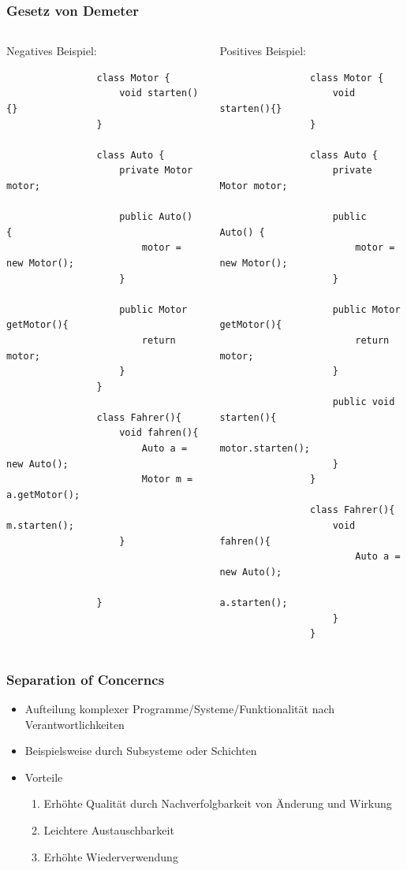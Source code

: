 \begin{frame}[fragile]
	\frametitle{Gesetz von Demeter}
	\begin{columns}
		\begin{column}{0.5\textwidth}
			Negatives Beispiel:
			\begin{lstlisting}
				class Motor {
					void starten(){}
				}
				
				class Auto {
					private Motor motor;
					
					public Auto() {
						motor = new Motor();
					}
					
					public Motor getMotor(){
						return motor;
					}
				}
				
				class Fahrer(){
					void fahren(){
						Auto a = new Auto();
						Motor m = a.getMotor();
						m.starten();
					}
						
						
					
				}
			\end{lstlisting}
		\end{column}
		\begin{column}{0.5\textwidth}
			Positives Beispiel:
			\begin{lstlisting}
				class Motor {
					void starten(){}
				}
				
				class Auto {
					private Motor motor;
					
					public Auto() {
						motor = new Motor();
					}
					
					public Motor getMotor(){
						return motor;
					}
					
					public void starten(){
						motor.starten();
					}
				}
				
				class Fahrer(){
					void fahren(){
						Auto a = new Auto();
						a.starten();
					}
				}
			\end{lstlisting}
		\end{column}
	\end{columns}
\end{frame}

\begin{frame}[fragile]
	\frametitle{Separation of Concerncs}
	\begin{itemize}
	  \item Aufteilung komplexer Programme/Systeme/Funktionalit\"at nach
	  Verantwortlichkeiten
	  \item Beispielsweise durch Subsysteme oder Schichten
	  \item Vorteile
	  \begin{enumerate}
	    \item Erh\"ohte Qualit\"at durch Nachverfolgbarkeit von 
	    \"Anderung und Wirkung
	    \item Leichtere Austauschbarkeit
	    \item Erh\"ohte Wiederverwendung
	  \end{enumerate}
	\end{itemize}
\end{frame}  

